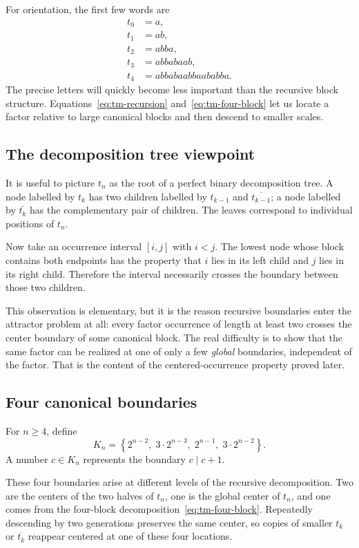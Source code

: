 \documentclass[11pt,a4paper]{article}
\theoremstyle{definition}\newtheorem{definition}[theorem]{Definition}
\theoremstyle{remark}\newtheorem{remark}[theorem]{Remark}
\begin{document}
For orientation, the first few words are
\[
\begin{aligned}
t_0&=a,\\
t_1&=ab,\\
t_2&=abba,\\
t_3&=abbabaab,\\
t_4&=abbabaabbaababba.
\end{aligned}
\]
The precise letters will quickly become less important than the recursive block structure. Equations~\eqref{eq:tm-recursion} and~\eqref{eq:tm-four-block} let us locate a factor relative to large canonical blocks and then descend to smaller scales.

\subsection{The decomposition tree viewpoint}
It is useful to picture $t_n$ as the root of a perfect binary decomposition tree. A node labelled by $t_k$ has two children labelled by $t_{k-1}$ and $\overline{t_{k-1}}$; a node labelled by $\overline{t_k}$ has the complementary pair of children. The leaves correspond to individual positions of $t_n$.

Now take an occurrence interval $[i,j]$ with $i<j$. The lowest node whose block contains both endpoints has the property that $i$ lies in its left child and $j$ lies in its right child. Therefore the interval necessarily crosses the boundary between those two children.

This observation is elementary, but it is the reason recursive boundaries enter the attractor problem at all: every factor occurrence of length at least two crosses the center boundary of some canonical block. The real difficulty is to show that the same factor can be realized at one of only a few \emph{global} boundaries, independent of the factor. That is the content of the centered-occurrence property proved later.

\subsection{Four canonical boundaries}
For $n\ge4$, define
\begin{equation}
K_n=\left\{2^{n-2},\;3\cdot2^{n-3},\;2^{n-1},\;3\cdot2^{n-2}\right\}.
\label{eq:canonical-boundaries}
\end{equation}
A number $c\in K_n$ represents the boundary $c\mid c+1$.

These four boundaries arise at different levels of the recursive decomposition. Two are the centers of the two halves of $t_n$, one is the global center of $t_n$, and one comes from the four-block decomposition~\eqref{eq:tm-four-block}. Repeatedly descending by two generations preserves the same center, so copies of smaller $t_k$ or $\overline{t_k}$ reappear centered at one of these four locations.
\end{document}
